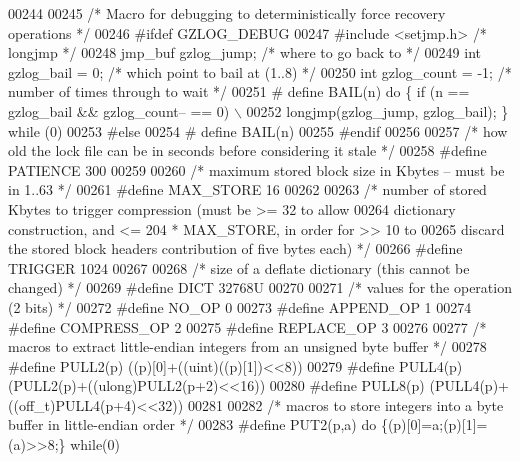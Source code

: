 \begin{DoxyCode}
00244 
00245 \textcolor{comment}{/* Macro for debugging to deterministically force recovery operations */}
00246 \textcolor{preprocessor}{#ifdef GZLOG\_DEBUG}
00247 \textcolor{preprocessor}{    #include <setjmp.h>}         \textcolor{comment}{/* longjmp */}
00248     jmp\_buf gzlog\_jump;         \textcolor{comment}{/* where to go back to */}
00249     \textcolor{keywordtype}{int} gzlog\_bail = 0;         \textcolor{comment}{/* which point to bail at (1..8) */}
00250     \textcolor{keywordtype}{int} gzlog\_count = -1;       \textcolor{comment}{/* number of times through to wait */}
00251 \textcolor{preprocessor}{#   define BAIL(n) do \{ if (n == gzlog\_bail && gzlog\_count-- == 0) \(\backslash\)}
00252 \textcolor{preprocessor}{                            longjmp(gzlog\_jump, gzlog\_bail); \} while (0)}
00253 \textcolor{preprocessor}{#else}
00254 \textcolor{preprocessor}{#   define BAIL(n)}
00255 \textcolor{preprocessor}{#endif}
00256 
00257 \textcolor{comment}{/* how old the lock file can be in seconds before considering it stale */}
00258 \textcolor{preprocessor}{#define PATIENCE 300}
00259 
00260 \textcolor{comment}{/* maximum stored block size in Kbytes -- must be in 1..63 */}
00261 \textcolor{preprocessor}{#define MAX\_STORE 16}
00262 
00263 \textcolor{comment}{/* number of stored Kbytes to trigger compression (must be >= 32 to allow}
00264 \textcolor{comment}{   dictionary construction, and <= 204 * MAX\_STORE, in order for >> 10 to}
00265 \textcolor{comment}{   discard the stored block headers contribution of five bytes each) */}
00266 \textcolor{preprocessor}{#define TRIGGER 1024}
00267 
00268 \textcolor{comment}{/* size of a deflate dictionary (this cannot be changed) */}
00269 \textcolor{preprocessor}{#define DICT 32768U}
00270 
00271 \textcolor{comment}{/* values for the operation (2 bits) */}
00272 \textcolor{preprocessor}{#define NO\_OP 0}
00273 \textcolor{preprocessor}{#define APPEND\_OP 1}
00274 \textcolor{preprocessor}{#define COMPRESS\_OP 2}
00275 \textcolor{preprocessor}{#define REPLACE\_OP 3}
00276 
00277 \textcolor{comment}{/* macros to extract little-endian integers from an unsigned byte buffer */}
00278 \textcolor{preprocessor}{#define PULL2(p) ((p)[0]+((uint)((p)[1])<<8))}
00279 \textcolor{preprocessor}{#define PULL4(p) (PULL2(p)+((ulong)PULL2(p+2)<<16))}
00280 \textcolor{preprocessor}{#define PULL8(p) (PULL4(p)+((off\_t)PULL4(p+4)<<32))}
00281 
00282 \textcolor{comment}{/* macros to store integers into a byte buffer in little-endian order */}
00283 \textcolor{preprocessor}{#define PUT2(p,a) do \{(p)[0]=a;(p)[1]=(a)>>8;\} while(0)}

\end{DoxyCode}
